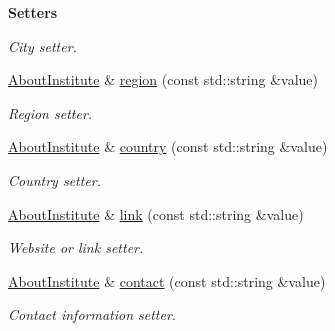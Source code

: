 \begin{Indent}{\bf Setters}
\begin{DoxyCompactItemize}
\begin{DoxyCompactList}\small\item\em City setter. \end{DoxyCompactList}\item 
\hyperlink{exceptionmagrathea_1_1AboutInstitute}{About\-Institute} \& \hyperlink{exceptionmagrathea_1_1AboutInstitute_a3e93958a94254303ba712a82962272c6}{region} (const std\-::string \&value)
\begin{DoxyCompactList}\small\item\em Region setter. \end{DoxyCompactList}\item 
\hyperlink{exceptionmagrathea_1_1AboutInstitute}{About\-Institute} \& \hyperlink{exceptionmagrathea_1_1AboutInstitute_a2b3f8882ea0c6d82346e59d1e6c283fa}{country} (const std\-::string \&value)
\begin{DoxyCompactList}\small\item\em Country setter. \end{DoxyCompactList}\item 
\hyperlink{exceptionmagrathea_1_1AboutInstitute}{About\-Institute} \& \hyperlink{exceptionmagrathea_1_1AboutInstitute_aaf87810274082a5d31cb8f636395c719}{link} (const std\-::string \&value)
\begin{DoxyCompactList}\small\item\em Website or link setter. \end{DoxyCompactList}\item 
\hyperlink{exceptionmagrathea_1_1AboutInstitute}{About\-Institute} \& \hyperlink{exceptionmagrathea_1_1AboutInstitute_a93f66ee8de4ef2f09b0f7191a8b2f58e}{contact} (const std\-::string \&value)
\begin{DoxyCompactList}\small\item\em Contact information setter. \end{DoxyCompactList}\end{DoxyCompactItemize}
\end{Indent}
